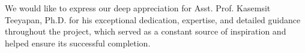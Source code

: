 \begin{abstract}



\end{abstract}

\iffalse
\begin{dedication}
This document is dedicated to all Chiang Mai University students.

Dedication page is optional.
\end{dedication}
\fi %

\begin{acknowledgments}
We would like to express our deep appreciation for Asst. Prof. Kasemsit Teeyapan, Ph.D. for his exceptional dedication, expertise, and detailed guidance throughout the project, which served as a constant source of inspiration and helped ensure its successful completion.

\end{acknowledgments}%
\fi %

\contentspage

\ifproject
\figurelistpage

\tablelistpage
\fi %




